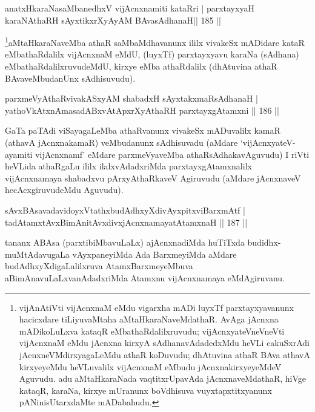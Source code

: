 \begin{shl}
anatxHkaraNasaMbanedhxV vijAcnxnamiti kataRri |
parxtayxyaH karaNAthaRH sAyxtikxrXyAyAM BAvasAdhanaH\hfill || 185 ||
\end{shl}

\begin{artha}
\footnote{vijAnAtiVti vijAcnxnaM eMdu vigarxha mADi luyxTf  parxtayxyavanunx hacicxdare tiLiyuvaMtaha aMtaH\-karaNaveMdathaR. AvAga  jAcnxna mADikoLuLxva kataqR eMbathaRdalilxruvudu; vijAcnxyateV\s neV\-neVti vijAcnxnaM eMdu jAcnxna kirxyA sAdhanavAdadedxMdu heVLi cakuSxrAdi jAcnxneVMdirxyagaLeMdu athaR koDuvudu; dhAtuvina athaR BAva athavA kirxyeyeMdu heVLuvalilx vijAcnxnaM eMbudu jAcnxnakirxyeyeMdeV Aguvudu. adu aMtaHkaraNada vaqtitxrUpavAda jAcnxnaveMdathaR, hiVge kataqR, karaNa, kirxye mUranunx boVdhisuva vuyxtapxtitxyanunx pANinisUtarxdaMte mADabahudu.}aMtaHkaraNaveMba athaR saMbaMdhavanunx ililx vivakeSx mADidare kataR eMbathaR\-dalilx vijAcnxnaM eMdU, (luyxTf) parxtayxyavu karaNa (sAdhana) eMbathaRdalilxruvu\-deMdU, kirxye eMba athaRdalilx (dhAtuvina athaR BAvaveMbudanUnx sAdhisu\-vudu).
\end{artha}

\begin{shl}
parxmeVyAthaRvivakASxyAM shabadxH sAyxtakxmaRsAdhanaH |\\
yathoVkAtxnAmasadABxvAtApxrXyAthaRH parxtayxgAtamxni \hfill || 186 ||
\end{shl}

\begin{artha}
GaTa paTAdi viSayagaLeMba athaRvanunx vivakeSx mADuvalilx kamaR (athavA 
jAcnxnakamaR) veMbudanunx sAdhisuvadu (aMdare `vijAcnxyateV-ayamiti \-vijAcnxnamf' eMdare parxmeVyaveMba athaRsAdhakavAguvudu) I riVti heVLida athaRgaLu ililx ilalxvAdadxriMda parxtayxgAtamxnalilx vijAcnxnamaya shabadxvu pArxyAthaRkaveV Agiruvudu (aMdare jAcnxnaveV hecAcxgiruvudeMdu Aguvudu).\\
\end{artha}


\begin{shl}
sAvxBAsavadavidoyxVtathxbudAdhxyXdivAyxpitxviBarxmAtf |\\
tadAtamxtAvxBimAnitAvxdivxjAcnxnamayatA\s \s tamxnaH \hfill || 187 ||
\end{shl}

\begin{artha}
tananx ABAsa (parxtibiMbavuLaLx) ajAcnxnadiMda huTiTxda budidhx-muMtAdavugaLa vAyxpaneyiMda Ada BarxmeyiMda aMdare budAdhxyXdigaLalilxruva AtamxBarxmeyeMbuva aBimAnavuLaLxvanAdadxriMda Atamxnu vijAcnxnamaya eMdAgiruvanu.
\end{artha}

